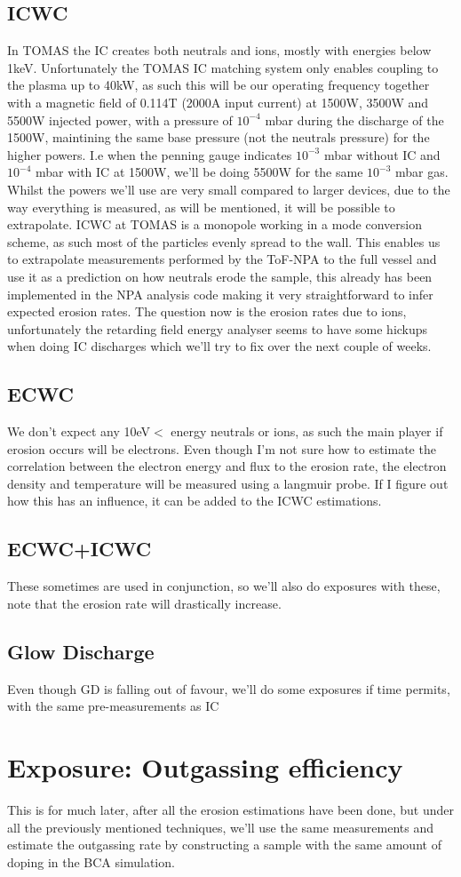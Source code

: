 \documentclass{article}
\begin{document}
\subsection{ICWC}
In TOMAS the IC creates both neutrals and ions, mostly with energies below
1keV.  Unfortunately the TOMAS IC matching system only enables coupling to the
plasma up to 40kW, as such this will be our operating frequency together with a
magnetic field of 0.114T (2000A input current) at 1500W, 3500W and 5500W
injected power, with a pressure of $10^{-4}$ mbar during the discharge of the
1500W, maintining the same base pressure (not the neutrals pressure) for the
higher powers. I.e when the penning gauge indicates $10^{-3}$ mbar without IC
and $10^{-4}$ mbar with IC at 1500W, we'll be doing 5500W for the same
$10^{-3}$ mbar gas. Whilst the powers we'll use are very small compared to
larger devices, due to the way everything is measured, as will be mentioned, it
will be possible to extrapolate.  ICWC at TOMAS is a monopole working in a mode
conversion scheme, as such most of the particles evenly spread to the wall.
This enables us to extrapolate measurements performed by the ToF-NPA to the
full vessel and use it as a prediction on how neutrals erode the sample, this
already has been implemented in the NPA analysis code making it very
straightforward to infer expected erosion rates. The question now is the
erosion rates due to ions, unfortunately the retarding field energy analyser
seems to have some hickups when doing IC discharges which we'll try to fix over
the next couple of weeks.
\subsection{ECWC}
We don't expect any 10eV$<$ energy neutrals or ions, as such the main player if
erosion occurs will be electrons. Even though I'm not sure how to estimate the
correlation between the electron energy and flux to the erosion rate, the
electron density and temperature will be measured using a langmuir probe.
If I figure out how this has an influence, it can be added to the ICWC estimations.
\subsection{ECWC+ICWC}
These sometimes are used in conjunction, so we'll also do exposures with these,
note that the erosion rate will drastically increase.
\subsection{Glow Discharge}
Even though GD is falling out of favour, we'll do some exposures if time permits, with the same 
pre-measurements as IC
\section{Exposure: Outgassing efficiency}
This is for much later, after all the erosion estimations have been done, but
under all the previously mentioned techniques, we'll use the same measurements
and estimate the outgassing rate by constructing a sample with the same amount
of doping in the BCA simulation.
\end{document}
